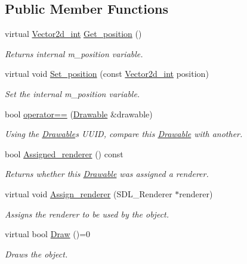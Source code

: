 \subsection*{Public Member Functions}
\begin{DoxyCompactItemize}
\item 
virtual \hyperlink{classjetfuel_1_1draw_1_1Vector2d}{Vector2d\+\_\+int} \hyperlink{classjetfuel_1_1draw_1_1Drawable_ae7ebd30d66db2c8a5d5371cbcf0023fc}{Get\+\_\+position} ()
\begin{DoxyCompactList}\small\item\em Returns internal m\+\_\+position variable. \end{DoxyCompactList}\item 
virtual void \hyperlink{classjetfuel_1_1draw_1_1Drawable_afdd035afe40c706459a6c9df813bcce6}{Set\+\_\+position} (const \hyperlink{classjetfuel_1_1draw_1_1Vector2d}{Vector2d\+\_\+int} position)
\begin{DoxyCompactList}\small\item\em Set the internal m\+\_\+position variable. \end{DoxyCompactList}\item 
bool \hyperlink{classjetfuel_1_1draw_1_1Drawable_a3b8d50394e8411a8009f50da826b3ac2}{operator==} (\hyperlink{classjetfuel_1_1draw_1_1Drawable}{Drawable} \&drawable)
\begin{DoxyCompactList}\small\item\em Using the \hyperlink{classjetfuel_1_1draw_1_1Drawable}{Drawable}\textquotesingle{}s U\+U\+ID, compare this \hyperlink{classjetfuel_1_1draw_1_1Drawable}{Drawable} with another. \end{DoxyCompactList}\item 
bool \hyperlink{classjetfuel_1_1draw_1_1Drawable_a6def0c6a514cb41cf4791191c06b4c3a}{Assigned\+\_\+renderer} () const
\begin{DoxyCompactList}\small\item\em Returns whether this \hyperlink{classjetfuel_1_1draw_1_1Drawable}{Drawable} was assigned a renderer. \end{DoxyCompactList}\item 
virtual void \hyperlink{classjetfuel_1_1draw_1_1Drawable_a0d7257f197d6ffcdd89c3a99c93d1400}{Assign\+\_\+renderer} (S\+D\+L\+\_\+\+Renderer $\ast$renderer)
\begin{DoxyCompactList}\small\item\em Assigns the renderer to be used by the object. \end{DoxyCompactList}\item 
virtual bool \hyperlink{classjetfuel_1_1draw_1_1Drawable_a1a072070322965ce9411ee6e7c311c56}{Draw} ()=0
\begin{DoxyCompactList}\small\item\em Draws the object. \end{DoxyCompactList}\end{DoxyCompactItemize}
